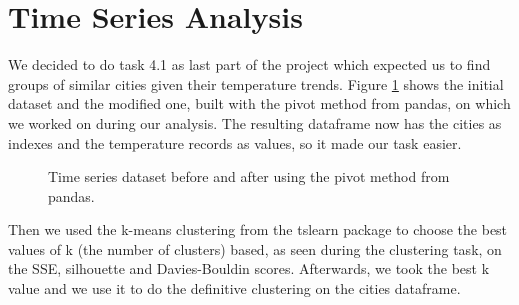 \section{Time Series Analysis}
We decided to do task 4.1 as last part of the project which expected us to find groups of similar cities given their temperature trends. Figure \ref{fig:timeseries_dataset} shows the initial dataset and the modified one, built with the pivot method from pandas, on which we worked on during our analysis. The resulting dataframe now has the cities as indexes and the temperature records as values, so it made our task easier.
\begin{figure}[H]
    \centering
    \caption{Time series dataset before and after using the pivot method from pandas.}
    \label{fig:timeseries_dataset}
\end{figure}
Then we used the k-means clustering from the tslearn package to choose the best values of k (the number of clusters) based, as seen during the clustering task, on the SSE, silhouette and Davies-Bouldin scores. Afterwards, we took the best k value and we use it to do the definitive clustering on the cities dataframe.
